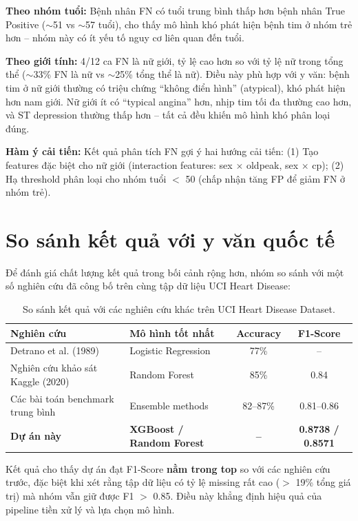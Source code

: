 \textbf{Theo nhóm tuổi:} Bệnh nhân FN có tuổi trung bình thấp hơn bệnh nhân True Positive ($\sim$51 vs $\sim$57 tuổi), cho thấy mô hình khó phát hiện bệnh tim ở nhóm trẻ hơn -- nhóm này có ít yếu tố nguy cơ liên quan đến tuổi.

\textbf{Theo giới tính:} 4/12 ca FN là nữ giới, tỷ lệ cao hơn so với tỷ lệ nữ trong tổng thể ($\sim$33\% FN là nữ vs $\sim$25\% tổng thể là nữ). Điều này phù hợp với y văn: bệnh tim ở nữ giới thường có triệu chứng ``không điển hình'' (atypical), khó phát hiện hơn nam giới. Nữ giới ít có ``typical angina'' hơn, nhịp tim tối đa thường cao hơn, và ST depression thường thấp hơn -- tất cả đều khiến mô hình khó phân loại đúng.

\textbf{Hàm ý cải tiến:} Kết quả phân tích FN gợi ý hai hướng cải tiến: (1) Tạo features đặc biệt cho nữ giới (interaction features: sex $\times$ oldpeak, sex $\times$ cp); (2) Hạ threshold phân loại cho nhóm tuổi $<$ 50 (chấp nhận tăng FP để giảm FN ở nhóm trẻ).

\section{So sánh kết quả với y văn quốc tế}

Để đánh giá chất lượng kết quả trong bối cảnh rộng hơn, nhóm so sánh với một số nghiên cứu đã công bố trên cùng tập dữ liệu UCI Heart Disease:

\begin{table}[H]
\centering
\caption{So sánh kết quả với các nghiên cứu khác trên UCI Heart Disease Dataset.}
\label{tab:literature_compare}
\small
\begin{tabular}{|l|l|c|c|}
\hline
\textbf{Nghiên cứu} & \textbf{Mô hình tốt nhất} & \textbf{Accuracy} & \textbf{F1-Score} \\ \hline
Detrano et al. (1989) \cite{detrano1989international} & Logistic Regression & 77\% & -- \\ \hline
Nghiên cứu khảo sát Kaggle (2020) & Random Forest & 85\% & 0.84 \\ \hline
Các bài toán benchmark trung bình & Ensemble methods & 82--87\% & 0.81--0.86 \\ \hline
\textbf{Dự án này} & \textbf{XGBoost / Random Forest} & \textbf{--} & \textbf{0.8738 / 0.8571} \\ \hline
\end{tabular}
\end{table}

Kết quả cho thấy dự án đạt F1-Score \textbf{nằm trong top} so với các nghiên cứu trước, đặc biệt khi xét rằng tập dữ liệu có tỷ lệ missing rất cao ($>$ 19\% tổng giá trị) mà nhóm vẫn giữ được F1 $>$ 0.85. Điều này khẳng định hiệu quả của pipeline tiền xử lý và lựa chọn mô hình.

